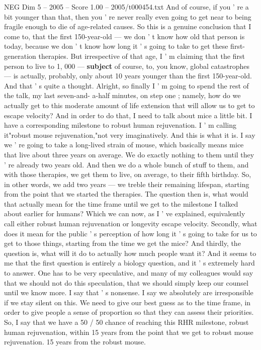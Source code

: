 \begin{textsample}{NEG Dim 5 – 2005 – Score 1.00 – 2005/t000454.txt}
And of course, if you ' re a bit younger than that, then you ' re never really even going to get near to being fragile enough to die of age-related causes.
So this is a genuine conclusion that I come to, that the first 150-year-old — we don ' t know how old that person is today, because we don ' t know how long it ' s going to take to get these first-generation therapies.
But irrespective of that age, I ' m claiming that the first person to live to 1, 000 — \textbf{subject} of course, to, you know, global catastrophes — is actually, probably, only about 10 years younger than the first 150-year-old.
And that ' s quite a thought.
Alright, so finally I ' m going to spend the rest of the talk, my last seven-and- a-half minutes, on step one ; namely, how do we actually get to this moderate amount of life extension that will allow us to get to escape velocity?
And in order to do that, I need to talk about mice a little bit.
I have a corresponding milestone to robust human rejuvenation.
I ' m calling it"robust mouse rejuvenation,"not very imaginatively.
And this is what it is.
I say we ' re going to take a long-lived strain of mouse, which basically means mice that live about three years on average.
We do exactly nothing to them until they ' re already two years old.
And then we do a whole bunch of stuff to them, and with those therapies, we get them to live, on average, to their fifth birthday.
So, in other words, we add two years — we treble their remaining lifespan, starting from the point that we started the therapies.
The question then is, what would that actually mean for the time frame until we get to the milestone I talked about earlier for humans?
Which we can now, as I ' ve explained, equivalently call either robust human rejuvenation or longevity escape velocity.
Secondly, what does it mean for the public ' s perception of how long it ' s going to take for us to get to those things, starting from the time we get the mice?
And thirdly, the question is, what will it do to actually how much people want it?
And it seems to me that the first question is entirely a biology question, and it ' s extremely hard to answer.
One has to be very speculative, and many of my colleagues would say that we should not do this speculation, that we should simply keep our counsel until we know more.
I say that ' s nonsense.
I say we absolutely are irresponsible if we stay silent on this.
We need to give our best guess as to the time frame, in order to give people a sense of proportion so that they can assess their priorities.
So, I say that we have a 50 / 50 chance of reaching this RHR milestone, robust human rejuvenation, within 15 years from the point that we get to robust mouse rejuvenation. 15 years from the robust mouse.

\end{textsample}
